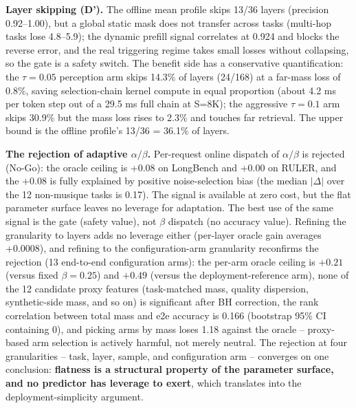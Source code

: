 \documentclass[11pt]{article}
\begin{document}
\textbf{Layer skipping (D').} The offline mean profile skips 13/36 layers (precision 0.92--1.00), but a global static mask does not transfer across tasks (multi-hop tasks lose 4.8--5.9); the dynamic prefill signal correlates at 0.924 and blocks the reverse error, and the real triggering regime takes small losses without collapsing, so the gate is a safety switch. The benefit side has a conservative quantification: the $\tau{=}0.05$ perception arm skips 14.3\% of layers (24/168) at a far-mass loss of 0.8\%, saving selection-chain kernel compute in equal proportion (about 4.2 ms per token step out of a 29.5 ms full chain at S=8K); the aggressive $\tau{=}0.1$ arm skips 30.9\% but the mass loss rises to 2.3\% and touches far retrieval. The upper bound is the offline profile's 13/36 = 36.1\% of layers.

\textbf{The rejection of adaptive $\alpha/\beta$.} Per-request online dispatch of $\alpha/\beta$ is rejected (No-Go): the oracle ceiling is +0.08 on LongBench and +0.00 on RULER, and the +0.08 is fully explained by positive noise-selection bias (the median $|\Delta|$ over the 12 non-musique tasks is 0.17). The signal is available at zero cost, but the flat parameter surface leaves no leverage for adaptation. The best use of the same signal is the gate (safety value), not $\beta$ dispatch (no accuracy value). Refining the granularity to layers adds no leverage either (per-layer oracle gain averages +0.0008), and refining to the configuration-arm granularity reconfirms the rejection (13 end-to-end configuration arms): the per-arm oracle ceiling is $+0.21$ (versus fixed $\beta{=}0.25$) and $+0.49$ (versus the deployment-reference arm), none of the 12 candidate proxy features (task-matched mass, quality dispersion, synthetic-side mass, and so on) is significant after BH correction, the rank correlation between total mass and e2e accuracy is 0.166 (bootstrap 95\% CI containing 0), and picking arms by mass loses 1.18 against the oracle -- proxy-based arm selection is actively harmful, not merely neutral. The rejection at four granularities -- task, layer, sample, and configuration arm -- converges on one conclusion: \textbf{flatness is a structural property of the parameter surface, and no predictor has leverage to exert}, which translates into the deployment-simplicity argument.
\end{document}
